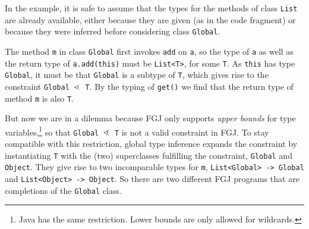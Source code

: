 In the example, it is safe to assume that the types for the methods of class \texttt{List}
are already available, either because they are given (as in the code
fragment) or because they were inferred before considering class \texttt{Global}.

The method \texttt{m} in class \texttt{Global} first invokes
\texttt{add} on \texttt{a}, so the type of \texttt{a} as well as the
return type of \texttt{a.add(this)} must be
\texttt{List<T>}, for some \texttt{T}. As \texttt{this} has
type \texttt{Global}, it must be that \texttt{Global} is a
subtype of \texttt{T}, which gives rise to the constraint
\texttt{Global $\lessdot$ T}. By the typing of \texttt{get()} we
find that the return type of method \texttt{m} is also \texttt{T}.

But now we are in a dilemma because FGJ only supports \emph{upper bounds} for
type variables,\footnote{Java has the same restriction. Lower bounds
  are only allowed for wildcards.} so that 
\texttt{Global $\lessdot$ T} is not a valid constraint in FGJ.
To stay compatible with this restriction, global type inference
expands the constraint by instantiating \texttt{T} with the (two) superclasses fulfilling
the constraint, \texttt{Global} and \texttt{Object}.  They give rise to two incomparable
types for 
\texttt{m}, \texttt{List<Global> -> Global} and
\texttt{List<Object> -> Object}. So there are two different FGJ
programs that are completions of the \texttt{Global} class.

